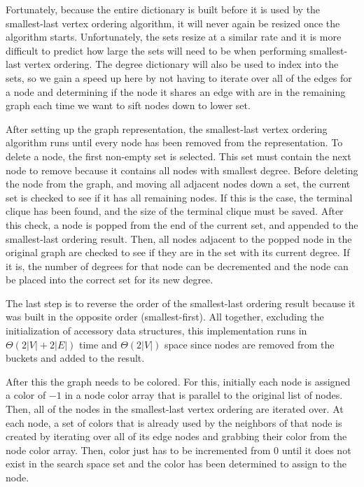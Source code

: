 \documentclass{article}
\begin{document}
        Fortunately, because the entire dictionary is built before it is used by the smallest-last vertex ordering algorithm, it will never again be resized once the algorithm starts. Unfortunately, the sets resize at a similar rate and it is more difficult to predict how large the sets will need to be when performing smallest-last vertex ordering. The degree dictionary will also be used to index into the sets, so we gain a speed up here by not having to iterate over all of the edges for a node and determining if the node it shares an edge with are in the remaining graph each time we want to sift nodes down to lower set.
        \par
        After setting up the graph representation, the smallest-last vertex ordering algorithm runs until every node has been removed from the representation. To delete a node, the first non-empty set is selected. This set must contain the next node to remove because it contains all nodes with smallest degree. Before deleting the node from the graph, and moving all adjacent nodes down a set, the current set is checked to see if it has all remaining nodes. If this is the case, the terminal clique has been found, and the size of the terminal clique must be saved. After this check, a node is popped from the end of the current set, and appended to the smallest-last ordering result. Then, all nodes adjacent to the popped node in the original graph are checked to see if they are in the set with its current degree. If it is, the number of degrees for that node can be decremented and the node can be placed into the correct set for its new degree.
        \par
        The last step is to reverse the order of the smallest-last ordering result because it was built in the opposite order (smallest-first). All together, excluding the initialization of accessory data structures, this implementation runs in $\Theta(2|V| + 2|E|)$ time and $\Theta(2|V|)$ space since nodes are removed from the buckets and added to the result.
        \par
        After this the graph needs to be colored. For this, initially each node is assigned a color of $-1$ in a node color array that is parallel to the original list of nodes. Then, all of the nodes in the smallest-last vertex ordering are iterated over. At each node, a set of colors that is already used by the neighbors of that node is created by iterating over all of its edge nodes and grabbing their color from the node color array. Then, color just has to be incremented from $0$ until it does not exist in the search space set and the color has been determined to assign to the node.
\end{document}
